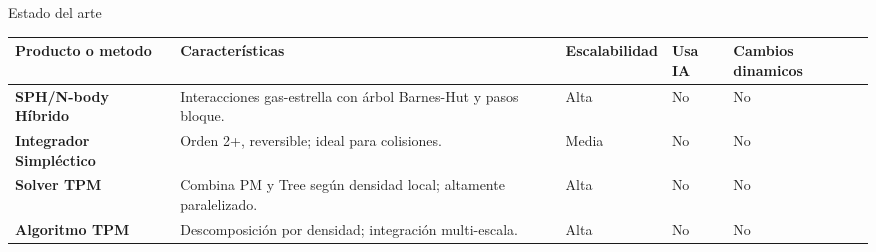 \begin{frame}{Estado del arte}
    \centering
    \label{tab:arte}
    \vspace{-0.1cm}
    \begin{adjustbox}{max width=0.9\textwidth,max height=0.7\textheight, keepaspectratio}
        \renewcommand{\arraystretch}{1.3}
            \begin{tabular}{@{}>{\bfseries}p{} p{} p{} p{} p{}@{}}
            \toprule
            \textbf{Producto o metodo} & \textbf{Características} & \textbf{Escalabilidad} & \textbf{Usa IA} & \textbf{Cambios dinamicos} \\
            \midrule
            SPH/N-body Híbrido & Interacciones gas-estrella con árbol Barnes-Hut y pasos bloque. & Alta & No & No \\
            Integrador Simpléctico & Orden 2+, reversible; ideal para colisiones. & Media & No & No \\
            Solver TPM & Combina PM y Tree según densidad local; altamente paralelizado. & Alta & No & No \\
            Algoritmo TPM & Descomposición por densidad; integración multi-escala. & Alta & No & No \\
            \bottomrule
            \end{tabular}
    \end{adjustbox}
    \smallskip
\end{frame}


